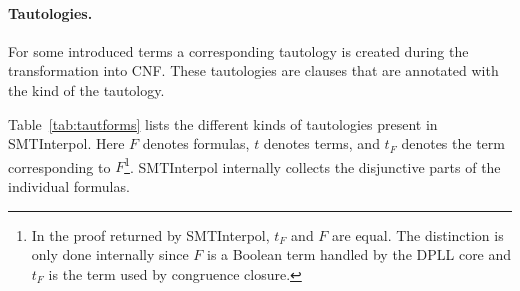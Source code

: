 \documentclass[a4paper]{article}
\newcommand\si{SMTInterpol\xspace}
\begin{document}
\paragraph{Tautologies.}  For some introduced terms a corresponding tautology
is created during the transformation into CNF.  These tautologies are
clauses that are annotated with the kind of the tautology.

Table~\ref{tab:tautforms} lists the different kinds of tautologies present
in \si.  Here $F$ denotes formulas, $t$ denotes terms,
and $t_F$ denotes the term corresponding to $F$\footnote{In the proof returned
  by \si, $t_F$ and $F$ are equal.  The distinction is only done internally
  since $F$ is a Boolean term handled by the DPLL core and $t_F$ is the term
  used by congruence closure.}.
\si internally collects the disjunctive parts of the individual formulas.
\end{document}
